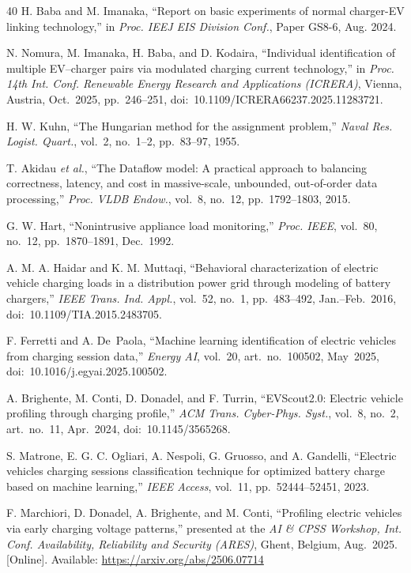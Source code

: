 \documentclass{ieeeaccess}
\begin{document}
\begin{thebibliography}{40}
         H. Baba and M. Imanaka, ``Report on basic experiments of normal charger-EV linking technology,'' in \textit{Proc. IEEJ EIS Division Conf.}, Paper GS8-6, Aug. 2024.

         N. Nomura, M. Imanaka, H. Baba, and D. Kodaira, ``Individual identification of multiple EV--charger pairs via modulated charging current technology,'' in \textit{Proc. 14th Int. Conf. Renewable Energy Research and Applications (ICRERA)}, Vienna, Austria, Oct.~2025, pp.~246--251, doi:~10.1109/ICRERA66237.2025.11283721.

         H. W. Kuhn, ``The Hungarian method for the assignment problem,'' \textit{Naval Res. Logist. Quart.}, vol.~2, no.~1--2, pp.~83--97, 1955.

         T. Akidau \textit{et al.}, ``The Dataflow model: A practical approach to balancing correctness, latency, and cost in massive-scale, unbounded, out-of-order data processing,'' \textit{Proc. VLDB Endow.}, vol.~8, no.~12, pp.~1792--1803, 2015.

         G. W. Hart, ``Nonintrusive appliance load monitoring,'' \textit{Proc. IEEE}, vol.~80, no.~12, pp.~1870--1891, Dec.~1992.

         A. M. A. Haidar and K. M. Muttaqi, ``Behavioral characterization of electric vehicle charging loads in a distribution power grid through modeling of battery chargers,'' \textit{IEEE Trans. Ind. Appl.}, vol.~52, no.~1, pp.~483--492, Jan.--Feb.~2016, doi:~10.1109/TIA.2015.2483705.

         F. Ferretti and A. De~Paola, ``Machine learning identification of electric vehicles from charging session data,'' \textit{Energy AI}, vol.~20, art.~no.~100502, May~2025, doi:~10.1016/j.egyai.2025.100502.

         A. Brighente, M. Conti, D. Donadel, and F. Turrin, ``EVScout2.0: Electric vehicle profiling through charging profile,'' \textit{ACM Trans. Cyber-Phys. Syst.}, vol.~8, no.~2, art.~no.~11, Apr.~2024, doi:~10.1145/3565268.

         S. Matrone, E. G. C. Ogliari, A. Nespoli, G. Gruosso, and A. Gandelli, ``Electric vehicles charging sessions classification technique for optimized battery charge based on machine learning,'' \textit{IEEE Access}, vol.~11, pp.~52444--52451, 2023.

         F. Marchiori, D. Donadel, A. Brighente, and M. Conti, ``Profiling electric vehicles via early charging voltage patterns,'' presented at the \textit{AI \& CPSS Workshop, Int. Conf. Availability, Reliability and Security (ARES)}, Ghent, Belgium, Aug.~2025. [Online]. Available: \url{https://arxiv.org/abs/2506.07714}


\end{thebibliography}
\end{document}
